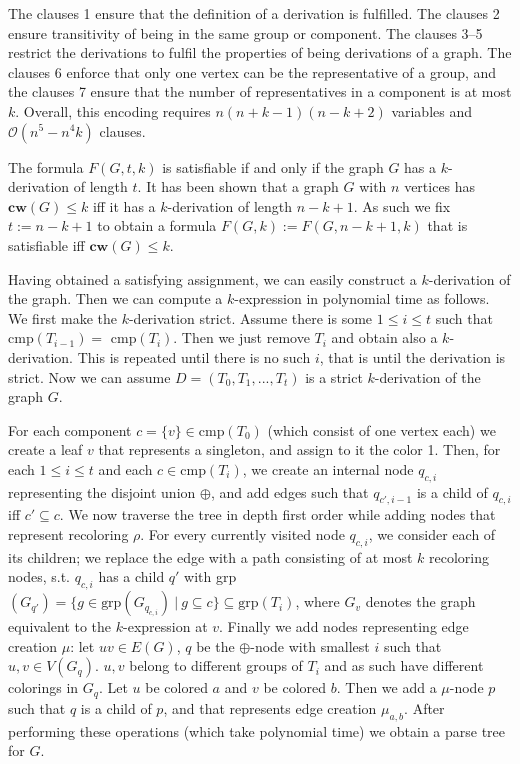 The clauses 1 ensure that the definition of a derivation is fulfilled.
The clauses 2 ensure transitivity of being in the same group or component.
The clauses 3--5 restrict the derivations to fulfil the properties of being derivations of a graph.
The clauses 6 enforce that only one vertex can be the representative of a group, and the clauses 7 ensure that the number of representatives in a component is at most $k$.
Overall, this encoding requires $n(n+k-1)(n-k+2)$ variables and $\mathcal{O}(n^5-n^4k)$ clauses.

The formula $F(G,t,k)$ is satisfiable if and only if the graph $G$ has a $k$-derivation of length $t$.
It has been shown that a graph $G$ with $n$ vertices has $\mathbf{cw}(G) \leq k$ iff it has a $k$-derivation of length $n-k+1$.
As such we fix $t:= n-k+1$ to obtain a formula $F(G,k) := F(G,n-k+1,k)$ that is satisfiable iff $\mathbf{cw}(G) \leq k$.

Having obtained a satisfying assignment, we can easily construct a $k$-derivation of the graph.
Then we can compute a $k$-expression in polynomial time as follows.
We first make the $k$-derivation strict.
Assume there is some $1 \leq i \leq t$ such that cmp$(T_{i-1}) = $ cmp$(T_i)$.
Then we just remove $T_i$ and obtain also a $k$-derivation.
This is repeated until there is no such $i$, that is until the derivation is strict.
Now we can assume $D = (T_0, T_1, ..., T_t)$ is a strict $k$-derivation of the graph $G$.

For each component $c = \{v\} \in \text{cmp}(T_0)$ (which consist of one vertex each) we create a leaf $v$ that represents a singleton, and assign to it the color 1.
Then, for each $1 \leq i \leq t$ and each $c \in \text{cmp}(T_i)$, we create an internal node $q_{c,i}$ representing the disjoint union $\oplus$, and add edges such that $q_{c', i-1}$ is a child of $q_{c,i}$ iff $c' \subseteq c$.
We now traverse the tree in depth first order while adding nodes that represent recoloring $\rho$.
For every currently visited node $q_{c,i}$, we consider each of its children; we replace the edge with a path consisting of at most $k$ recoloring nodes, s.t. $q_{c,i}$ has a child $q'$ with grp$(G_{q'}) = \{ g\in \text{grp}(G_{q_{c,i}}) \ | \ g \subseteq c \} \subseteq \text{grp}(T_i)$, where $G_v$ denotes the graph equivalent to the $k$-expression at $v$.
Finally we add nodes representing edge creation $\mu$: let $uv \in E(G)$, $q$ be the $\oplus$-node with smallest $i$ such that $u,v \in V(G_{q})$.
$u,v$ belong to different groups of $T_i$ and as such have different colorings in $G_q$. Let $u$ be colored $a$ and $v$ be colored $b$. Then we add a $\mu$-node $p$ such that $q$ is a child of $p$, and that represents edge creation $\mu_{a,b}$.
After performing these operations (which take polynomial time) we obtain a parse tree for $G$.









